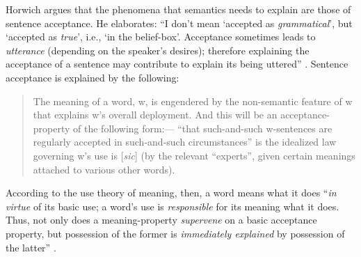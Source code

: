 Horwich argues that the phenomena that semantics needs to explain are those of sentence acceptance. He elaborates: “I don’t mean ‘accepted as \textit{grammatical}’, but ‘accepted as \textit{true}’, i.e., ‘in the belief-box’. Acceptance sometimes leads to \textit{utterance} (depending on the speaker’s desires); therefore explaining the acceptance of a sentence may contribute to explain its being uttered” \citep[315, fn. 9, emphasis in original]{Horwich2008}. Sentence acceptance is explained by the following:
\begin{quote}
The meaning of a word, w, is engendered by the non-semantic feature of w that explains w’s overall deployment. And this will be an acceptance-property of the following form:— “that such-and-such w-sentences are regularly accepted in such-and-such circumstances” is the idealized law governing w’s use is [\textit{sic}] (by the relevant “experts”, given certain meanings attached to various other words). \citep[28]{Horwich2005}
\end{quote}
According to the use theory of meaning, then, a word means what it does “\textit{in virtue} of its basic use; a word’s use is \textit{responsible} for its meaning what it does. Thus, not only does a meaning-property \textit{supervene} on a basic acceptance property, but possession of the former is \textit{immediately explained} by possession of the latter” \citep[32, emphasis in original]{Horwich2005}.

